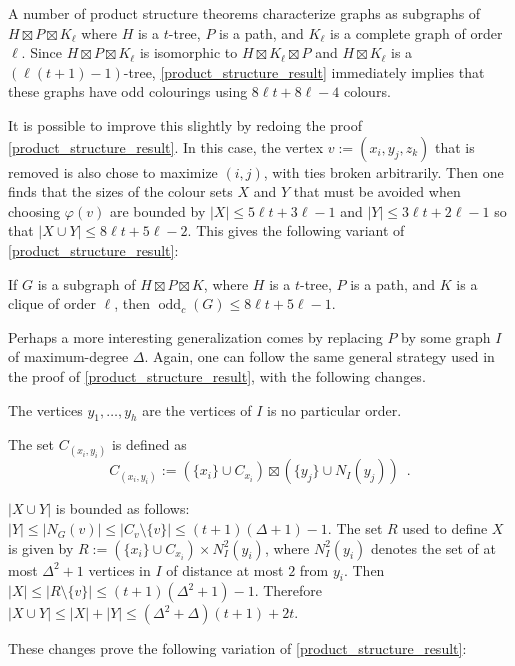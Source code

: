 \documentclass{patmorin}
\DeclareMathOperator{\odd}{odd}
\newcommand{\oddc}{\odd_c}
\begin{document}

A number of product structure theorems characterize graphs as subgraphs of $H\boxtimes P\boxtimes K_{\ell}$ where $H$ is a $t$-tree, $P$ is a path, and $K_\ell$ is a complete graph of order $\ell$.  Since $H\boxtimes P\boxtimes K_{\ell}$ is isomorphic to $H\boxtimes K_\ell\boxtimes P$ and $H\boxtimes K_\ell$ is a $(\ell(t+1)-1)$-tree, \cref{product_structure_result} immediately implies that these graphs have odd colourings using $8\ell t+8\ell-4$ colours.

It is possible to improve this slightly by redoing the proof \cref{product_structure_result}.  In this case, the vertex $v:=(x_i,y_j,z_k)$ that is removed is also chose to maximize $(i,j)$, with ties broken arbitrarily. Then one finds that the sizes of the colour sets $X$ and $Y$ that must be avoided when choosing $\varphi(v)$ are bounded by $|X|\le 5\ell t + 3\ell-1$ and $|Y|\le 3\ell t + 2\ell -1$ so that $|X\cup Y|\le 8\ell t + 5\ell -2$. This gives the following variant of \cref{product_structure_result}:

\begin{thm}\label{product_structure_result_kl}
  If $G$ is a subgraph of $H\boxtimes P\boxtimes K$, where $H$ is a $t$-tree, $P$ is a path, and $K$ is a clique of order $\ell$, then $\oddc(G)\le 8\ell t + 5\ell -1$.
\end{thm}


Perhaps a more interesting generalization comes by replacing $P$ by some graph $I$ of maximum-degree $\Delta$.  Again, one can follow the same general strategy used in the proof of \cref{product_structure_result}, with the following changes.
\begin{compactitem}
  \item The vertices $y_1,\ldots,y_h$ are the vertices of $I$ is no particular order.
  \item The set $C_{(x_i,y_i)}$ is defined as
\[
    C_{(x_i,y_i)}:=(\{x_i\}\cup C_{x_i})\boxtimes (\{y_j\}\cup N_I(y_j)) \enspace .
\]
  \item $|X\cup Y|$ is bounded as follows: $|Y|\le|N_G(v)|\le |C_v\setminus\{v\}| \le (t+1)(\Delta+1)-1$.  The set $R$ used to define $X$ is given by $R:=(\{x_i\}\cup C_{x_i})\times N^2_I(y_i)$, where $N^2_I(y_i)$ denotes the set of at most $\Delta^2+1$ vertices in $I$ of distance at most $2$ from $y_i$.  Then $|X|\le|R\setminus\{v\}|\le (t+1)(\Delta^2+1)-1$.  Therefore $|X\cup Y|\le |X|+|Y|\le (\Delta^2+\Delta)(t+1)+2t$.
\end{compactitem}
These changes prove the following variation of \cref{product_structure_result}:
\end{document}
